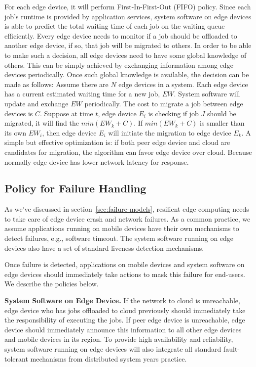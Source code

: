 For each edge device, it will perform First-In-First-Out (FIFO) policy. Since each job's runtime
is provided by application services, system software on edge devices is able to predict the total waiting time of each job
on the waiting queue efficiently. Every edge device needs to monitor if a job should be offloaded to another edge device,
if so, that job will be migrated to others.
In order to be able to make such a decision, all edge devices need to have some global knowledge
of others. This can be simply achieved by exchanging information among edge devices periodically.
Once such global knowledge is available, the decision can be made as follows: Assume there are \(N\)
edge devices in a system. Each edge device has a current estimated waiting time for a new job, \(EW\).
System software will update and exchange \(EW\) periodically.
The cost to migrate a job between edge devices is \(C\). Suppose at time \(t\), edge device \(E_i\) is
checking if job \(J\) should be migrated, it will find the \(min(EW_k + C)\).
If \(min(EW_k + C)\) is smaller than its own \(EW_i\), then edge device \(E_i\) will initiate the migration
to edge device \(E_k\). A simple but effective optimization is: if both peer edge device and cloud are
candidates for migration, the algorithm can favor edge device over cloud. Because normally edge device
has lower network latency for response.

\subsection{Policy for Failure Handling}
\label{sec:policy-fault}
As we've discussed in section~\ref{sec:failure-models}, resilient edge computing needs to
take care of edge device crash and network failures. As a common practice, we assume applications running on mobile
devices have their own mechanisms to detect failures, e.g., software timeout. The system
software running on edge devices also have a set of standard liveness detection mechanisms.

Once failure is detected, applications on mobile devices and system software on edge devices
should immediately take actions to mask this failure for end-users. We describe the policies below.

\hfill\break
\noindent \textbf{System Software on Edge Device.}
If the network to cloud is unreachable, edge device who has jobs offloaded to cloud previously should
immediately take the responsibility of executing the jobs. If peer edge device is unreachable,
edge device should immediately announce this information to all other edge devices and mobile devices
in its region. To provide high availability and reliability, system software running on edge devices
will also integrate all standard fault-tolerant mechanisms from distributed system years practice\cite{cavage-queue13,google-acm16}.

